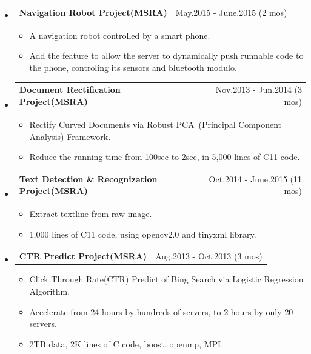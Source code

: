 \documentclass[a4paper,11pt]{article}
\makeatletter
\newcommand{\ressubheadingsingleline}[2]{
    \begin{tabular*}{6.5in}{l@{\extracolsep{\fill}}r}
        \textbf{#1} & #2 \\
    \end{tabular*}\vspace{-6pt}
}
\newcommand{\CC}{C\nolinebreak\hspace{-.05em}\raisebox{.4ex}{\tiny\bf +}\nolinebreak\hspace{-.10em}\raisebox{.4ex}{\tiny\bf +}}
\newcommand{\CS}{C\nolinebreak\hspace{-.05em}\raisebox{.6ex}{\scriptsize\bf{\#}}}
\makeatother
\begin{document}
\begin{itemize} \setlength{\itemsep}{-3pt}
    \item
        \ressubheadingsingleline{Navigation Robot Project(MSRA)}{May.2015 - June.2015 (2 mos)}
            \begin{itemize}
                \item A navigation robot controlled by a smart phone.
                \item Add the feature to allow the server to dynamically push runnable code to the phone, controling its sensors and bluetooth modulo.
            \end{itemize}
	\item 
		\ressubheadingsingleline{Document Rectification Project(MSRA)}{Nov.2013 - Jun.2014 (3 mos)}
			\begin{itemize} \setlength{\itemsep}{0pt}
				\item Rectify Curved Documents 
					via Robust PCA\
					(Principal Component Analysis) Framework.
				\item Reduce the running time from 100sec to 2sec, in 5,000 lines of \CC{}11 code.
			\end{itemize} 
	\item
		\ressubheadingsingleline{Text Detection \& Recognization Project(MSRA)}{Oct.2014 - June.2015 (11 mos)}
            \begin{itemize}
                \item Extract textline from raw image.
                \item 1,000 lines of \CC{}11 code, using opencv2.0 and tinyxml library. 
            \end{itemize}
	\item 
		\ressubheadingsingleline{CTR Predict Project(MSRA)}{Aug.2013 - Oct.2013 (3 mos)}
			\begin{itemize} \setlength{\itemsep}{0pt}
				\item Click Through Rate(CTR) Predict of Bing Search
					via Logistic Regression Algorithm.
				\item Accelerate from 24 hours by hundreds of 
					servers, 
					to 2 hours by only 20 servers.  
				\item 2TB data, 2K lines of \CC{} code, boost, openmp, MPI.
			\end{itemize}
\end{itemize}
\end{document}
